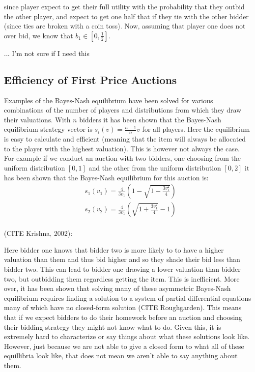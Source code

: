 \documentclass[12pt,twoside]{reedthesis}
\begin{document}
since player expect to get their full utility with the probability that they outbid the other player, and expect to get one half that if they tie with the other bidder (since ties are broken with a coin toss). Now, assuming that player one does not over bid, we know that $b_1 \in [0, \frac{1}{2}]$.

... I'm not sure if I need this

\subsection{Efficiency of First Price Auctions}
Examples of the Bayes-Nash equilibrium have been solved for various combinations of the number of players and distributions from which they draw their valuations. With $n$ bidders it has been shown that the Bayes-Nash equilibrium strategy vector is $s_i(v) = \frac{n-1}{n} v$ for all players. Here the equilibrium is easy to calculate and efficient (meaning that the item will always be allocated to the player with the highest valuation). This is however not always the case. For example if we conduct an auction with two bidders, one choosing from the uniform distribution $[0,1]$ and the other from the uniform distribution $[0,2]$ it has been shown that the Bayes-Nash equilibrium for this auction is:
\begin{align*}
	&s_1(v_1) = \frac{4}{3 v_1} \left(1 - \sqrt{1 - \frac{3v_1^2}{4}}\right)\\
	&s_2(v_2) = \frac{4}{3 v_1} \left(\sqrt{1 + \frac{3v_1^2}{4}} - 1 \right)\\
\end{align*}
 
(CITE Krishna, 2002):

Here bidder one knows that bidder two is more likely to to have a higher valuation than them and thus bid higher and so they shade their bid less than bidder two. This can lead to bidder one drawing a lower valuation than bidder two, but outbidding them regardless getting the item. This is inefficient. More over, it has been shown that solving many of these asymmetric Bayes-Nash equilibrium requires finding a solution to a system of partial differential equations many of which have no closed-form solution (CITE Roughgarden). This means that if we expect bidders to do their homework before an auction and choosing their bidding strategy they might not know what to do. Given this, it is extremely hard to characterize or say things about what these solutions look like. However, just because we are not able to give a closed form to what all of these equillibria look like, that does not mean we aren't able to say anything about them. 
\end{document}
